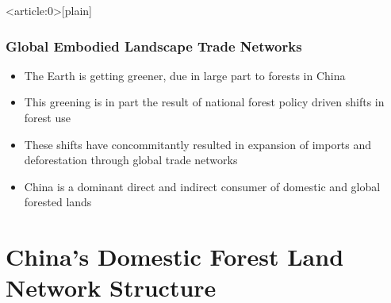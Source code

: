 \documentclass[aspectratio=169]{beamer}
\begin{document}
{ %
    \begin{frame}<article:0>[plain]
      \frametitle{}
     \end{frame}
}



\begin{frame}
  \frametitle{Global Embodied Landscape Trade Networks}
  \begin{itemize}
  \item The Earth is getting greener, due in large part to forests in
  China \pause
  \item This greening is in part the result of national forest policy
  driven shifts in forest use \pause
  \item These shifts have concommitantly resulted in expansion of
  imports and deforestation through global trade networks \pause
  \item China is a dominant direct and indirect consumer of domestic
  and global forested lands
  \end{itemize}
\end{frame}


\section{China's Domestic Forest Land Network Structure}
\end{document}
